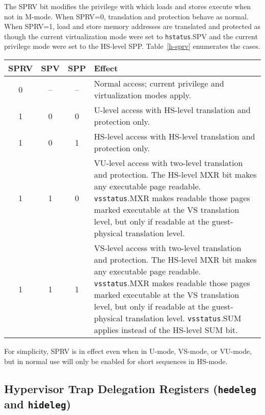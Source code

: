 The SPRV bit modifies the privilege with which loads and stores execute when
not in M-mode.
When SPRV=0, translation and protection behave as normal.  When SPRV=1,
load and store memory addresses are translated and protected as though
the current virtualization mode were set to {\tt hstatus}.SPV and the current
privilege mode were set to the HS-level SPP.
Table~\ref{h-sprv} enumerates the cases.

\begin{table*}[h!]
\begin{center}
\begin{tabular}{|c|c|c||p{4.7in}|}
  \hline
   SPRV & SPV & SPP & Effect \\ \hline \hline
   0    & --  & --  & Normal access; current privilege and virtualization modes apply. \\ \hline
   1    & 0   & 0   & U-level access with HS-level translation and protection only. \\ \hline
   1    & 0   & 1   & HS-level access with HS-level translation and protection only. \\ \hline
   1    & 1   & 0   & VU-level access with two-level translation and protection. The HS-level MXR bit makes any executable page readable.  {\tt vsstatus}.MXR makes readable those pages marked executable at the VS translation level, but only if readable at the guest-physical translation level. \\ \hline
   1    & 1   & 1   & VS-level access with two-level translation and protection. The HS-level MXR bit makes any executable page readable.  {\tt vsstatus}.MXR makes readable those pages marked executable at the VS translation level, but only if readable at the guest-physical translation level.  {\tt vsstatus}.SUM applies instead of the HS-level SUM bit. \\ \hline
 \end{tabular}
\end{center}
\caption{Effect of SPRV on load and store translation and protection.}
\label{h-sprv}
\end{table*}

\begin{commentary}
For simplicity, SPRV is in effect even when in U-mode, VS-mode, or VU-mode, but
in normal use will only be enabled for short sequences in HS-mode.
\end{commentary}

\subsection{Hypervisor Trap Delegation Registers ({\tt hedeleg} and {\tt hideleg})}

